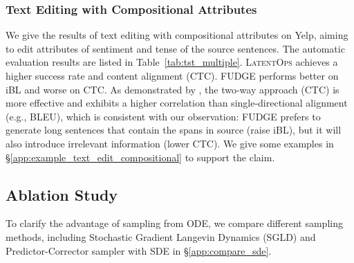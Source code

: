 \documentclass[11pt]{article}
\begin{document}
\subsubsection{Text Editing with Compositional Attributes}
\label{sec:text_edit_compositional}
We give the results of text editing with compositional attributes on Yelp, aiming to edit attributes of sentiment and tense of the source sentences. 
The automatic evaluation results are listed in Table~\ref{tab:tst_multiple}. 
\textsc{LatentOps} achieves a higher success rate and content alignment (CTC). 
FUDGE performs better on iBL and worse on CTC. As demonstrated by \citet{ctc_score}, the two-way approach (CTC) is more effective and exhibits a higher correlation than single-directional alignment (e.g., BLEU), which is consistent with our observation: FUDGE prefers to generate long sentences that contain the spans in source (raise iBL), but it will also introduce irrelevant information (lower CTC). We give some examples in \S\ref{app:example_text_edit_compositional} to support the claim. 
\subsection{Ablation Study}
To clarify the advantage of sampling from ODE, we compare different sampling methods, including Stochastic Gradient Langevin Dynamics (SGLD) and Predictor-Corrector sampler with SDE in \S\ref{app:compare_sde}.
\end{document}
